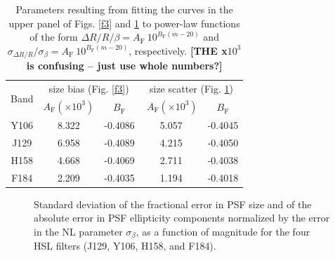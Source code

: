 \documentclass[11pt,preprint,flushrt]{aastex}
\begin{document}
\begin{table}
\centering
\begin{tabular}{|c|c|c|c|c|}
\hline
\multirow{2}{*}{Band} & \multicolumn{2}{c|}{size bias (Fig. \ref{f3})} & \multicolumn{2}{c|}{size scatter (Fig. \ref{f5})} \\
\cline{2-5}
& $A_{\text{F}} (\times 10^3)$ & $B_{\text{F}}$ & $\ A_{\text{F}} (\times 10^3)$ & $B_{\text{F}}$  \\
\hline
Y106 & 8.322 & -0.4086 & 5.057 &  -0.4045  \\
\hline
J129 & 6.958 & -0.4089  & 4.215 &  -0.4050 \\
\hline
H158 & 4.668 & -0.4069 & 2.711 &  -0.4038 \\
\hline
F184 & 2.209 & -0.4035 & 1.194 &  -0.4018 \\
\hline
\end{tabular}
\caption{Parameters resulting from fitting the curves in the upper panel of Figs. \ref{f3} and \ref{f5} to power-law functions of the form $\Delta R/ R/ \beta = A_{\text{F}}\ 10^{B_{\text{F}} (m - 20)}$ and $\sigma_{\Delta R/ R}/ \sigma_{\beta} = A_{\text{F}}\ 10^{B_{\text{F}} (m - 20)}$, respectively. \textbf{[THE x$10^3$ is confusing -- just use whole numbers?]}}
\label{table2}
\end{table}

\begin{figure}[!h]
\centering
{}
\caption{Standard deviation of the fractional error in PSF size and of the absolute error in PSF ellipticity components normalized by the error in the NL parameter $\sigma_\beta$, as a function of magnitude for the four HSL filters (J129, Y106, H158, and F184).}
\label{f5}
\end{figure}
\end{document}
